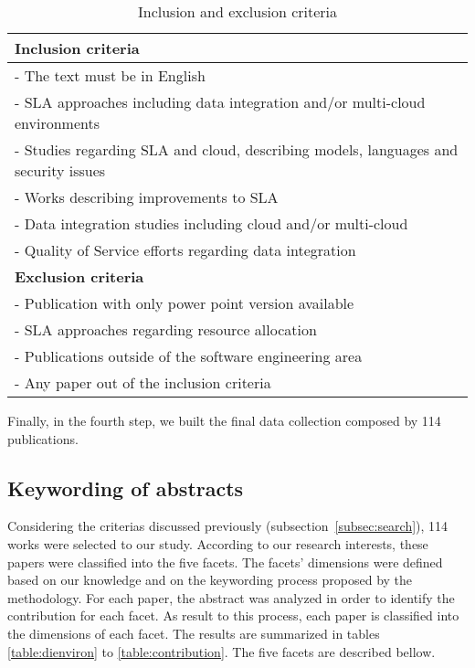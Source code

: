 \begin{table}[!htb]
\begin{center}
\begin{tabular}{p{10cm}}
\bottomrule \hline
\textbf{Inclusion criteria} \\ 
\hline 
- The text must be in English \\ 
- SLA approaches including data integration and/or multi-cloud environments\\
- Studies regarding SLA and cloud, describing models, languages and security issues \\
- Works describing improvements to SLA \\
- Data integration studies including cloud and/or multi-cloud  \\
- Quality of Service efforts regarding data integration \\
\bottomrule \hline 
\textbf{Exclusion criteria} \\ 
\hline 
- Publication with only power point version available \\ 
- SLA approaches regarding resource allocation \\
- Publications outside of the software engineering area \\
- Any paper out of the inclusion criteria  \\
\bottomrule \hline
\end{tabular} 
\end{center}
\caption{Inclusion and exclusion criteria}\label{table:criteria}
\end{table}

Finally, in the fourth step, we built the final data collection composed by 114 publications.

\subsection{Keywording of abstracts}

Considering the criterias discussed previously (subsection~\ref{subsec:search}),
114 works were selected to our study. 
According to our research interests, these papers were classified into the five facets. 
The facets' dimensions were defined based on our knowledge and on the keywording process proposed by the
methodology.   
For each paper, the abstract
was analyzed in order to identify the contribution for each facet.
As result to this process, each paper is classified into the dimensions of each facet. 
The results are summarized in tables \ref{table:dienviron} to \ref{table:contribution}. 
The five facets are described bellow.


